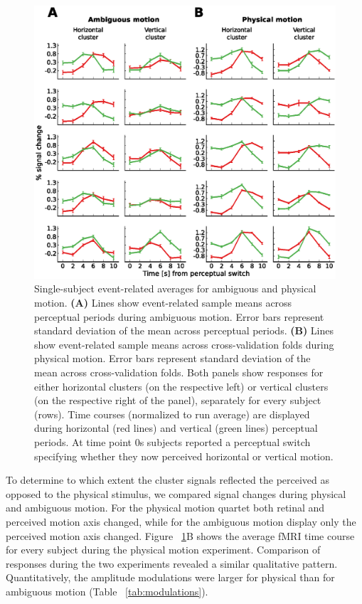 \begin{figure}[htbp!]
\centering
\includegraphics[width=\textwidth]{figures/chapter_03/fig2.eps}
\caption{Single-subject event-related averages for ambiguous and physical motion. \textbf{(A)} Lines show event-related sample means across perceptual periods during ambiguous motion. Error bars represent standard deviation of the mean across perceptual periods. \textbf{(B)} Lines show event-related sample means across cross-validation folds during physical motion. Error bars represent standard deviation of the mean across cross-validation folds. Both panels show responses for either horizontal clusters (on the respective left) or vertical clusters (on the respective right of the panel), separately for every subject (rows). Time courses (normalized to run average) are displayed during horizontal (red lines) and vertical (green lines) perceptual periods. At time point 0s subjects reported a perceptual switch specifying whether they now perceived horizontal or vertical motion.}
\label{fig:single_subject_results}
\end{figure}

To determine to which extent the cluster signals reflected the perceived as opposed to the physical stimulus, we compared signal changes during physical and ambiguous motion. For the physical motion quartet both retinal and perceived motion axis changed, while for the ambiguous motion display only the perceived motion axis changed. Figure ~\ref{fig:single_subject_results}B shows the average fMRI time course for every subject during the physical motion experiment. Comparison of responses during the two experiments revealed a similar qualitative pattern. Quantitatively, the amplitude modulations were larger for physical than for ambiguous motion (Table ~\ref{tab:modulations}).

